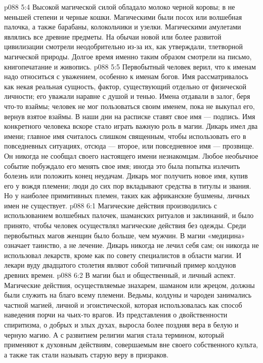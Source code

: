\vs p088 5:4 Высокой магической силой обладало молоко черной коровы; в не меньшей степени и черные кошки. Магическими были посох или волшебная палочка, а также барабаны, колокольчики и узелки. Магическими амулетами являлись все древние предметы. На обычаи новой или более развитой цивилизации смотрели неодобрительно из\hyp{}за их, как утверждали, тлетворной магической природы. Долгое время именно таким образом смотрели на письмо, книгопечатание и живопись.
\vs p088 5:5 Первобытный человек верил, что к именам надо относиться с уважением, особенно к именам богов. Имя рассматривалось как некая реальная сущность, фактор, существующий отдельно от физической личности; его уважали наравне с душой и тенью. Имена отдавали в залог, беря что\hyp{}то взаймы; человек не мог пользоваться своим именем, пока не выкупал его, вернув взятое взаймы. В наши дни на расписке ставят свое имя --- подпись. Имя конкретного человека вскоре стало играть важную роль в магии. Дикарь имел два имени; главное имя считалось слишком священным, чтобы использовать его в повседневных ситуациях, отсюда --- второе, или повседневное имя --- прозвище. Он никогда не сообщал своего настоящего имени незнакомцам. Любое необычное событие побуждало его менять свое имя; иногда это была попытка излечить болезнь или положить конец неудачам. Дикарь мог получить новое имя, купив его у вождя племени; люди до сих пор вкладывают средства в титулы и звания. Но у наиболее примитивных племен, таких как африканские бушмены, личных имен не существует.
\vs p088 6:1 Магические действия производились с использованием волшебных палочек, шаманских ритуалов и заклинаний, и было принято, чтобы человек осуществлял магические действия без одежды. Среди первобытных магов женщин было больше, чем мужчин. В магии «медицина» означает таинство, а не лечение. Дикарь никогда не лечил себя сам; он никогда не использовал лекарств, кроме как по совету специалистов в области магии. И лекари вуду двадцатого столетия являют собой типичный пример колдунов древних времен.
\vs p088 6:2 В магии был и общественный, и личный аспект. Магические действия, осуществляемые знахарем, шаманом или жрецом, должны были служить на благо всему племени. Ведьмы, колдуны и чародеи занимались частной магией, личной и эгоистической, которая использовалась как способ наведения порчи на чьих\hyp{}то врагов. Из представления о двойственности спиритизма, о добрых и злых духах, выросла более поздняя вера в белую и черную магию. А с развитием религии магия стала термином, который применяют к духовным действиям, совершаемым вне своего собственного культа, а также так стали называть старую веру в призраков.
